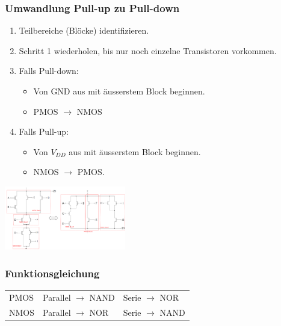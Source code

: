 \subsubsection{Umwandlung Pull-up zu Pull-down}
\begin{enumerate}
    \item Teilbereiche (Blöcke) identifizieren.
    \item Schritt 1 wiederholen, bis nur noch einzelne Transistoren vorkommen. 
    \item Falls Pull-down:
    \begin{itemize}
        \item Von GND aus mit äusserstem Block beginnen.
        \item PMOS $\rightarrow$ NMOS
    \end{itemize}
    \item Falls Pull-up:
    \begin{itemize}
        \item Von $V_{DD}$ aus mit äusserstem Block beginnen.
        \item NMOS $\rightarrow$ PMOS.
    \end{itemize}
\end{enumerate}
\includegraphics[width = 53mm]{images/pnmosconv.png}
\subsubsection{Funktionsgleichung}
\begin{flushleft}
    \begin{tabular}{l l l}
        PMOS & Parallel $\rightarrow$ NAND & Serie $\rightarrow$ NOR\\
        NMOS & Parallel $\rightarrow$ NOR & Serie $\rightarrow$ NAND\\
    \end{tabular}
\end{flushleft}